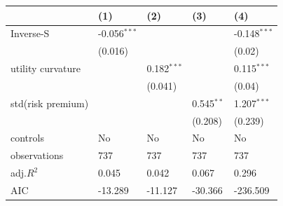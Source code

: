 \begin{tabular}{lllll}
\hline
 & (1) & (2) & (3) & (4) \\
\hline
Inverse-S & -0.056$^{***}$ &  &  & -0.148$^{***}$ \\
 & (0.016) &  &  & (0.02) \\
utility curvature &  & 0.182$^{***}$ &  & 0.115$^{***}$ \\
 &  & (0.041) &  & (0.04) \\
std(risk premium) &  &  & 0.545$^{**}$ & 1.207$^{***}$ \\
 &  &  & (0.208) & (0.239) \\
controls & No & No & No & No \\
observations & 737 & 737 & 737 & 737 \\
adj.$R^2$ & 0.045 & 0.042 & 0.067 & 0.296 \\
AIC & -13.289 & -11.127 & -30.366 & -236.509 \\
\hline
\end{tabular}

